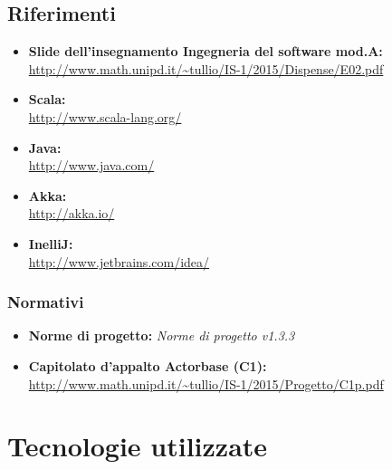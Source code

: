 \documentclass[a4paper]{article}
\begin{document}
	\subsection{Riferimenti}
		\begin{itemize}
			\item \textbf{Slide dell'insegnamento Ingegneria del software mod.A:} \\
			\url{http://www.math.unipd.it/~tullio/IS-1/2015/Dispense/E02.pdf}
			\item \textbf{Scala:} \\
			\url{http://www.scala-lang.org/}
			\item \textbf{Java:} \\
			\url{http://www.java.com/}
			\item \textbf{Akka:} \\
			\url{http://akka.io/}
			\item \textbf{InelliJ:} \\
			\url{http://www.jetbrains.com/idea/}
		\end{itemize}
	\subsubsection{Normativi}
		\begin{itemize}
			\item \textbf{Norme di progetto:} \emph{Norme di progetto v1.3.3}
			\item \textbf{Capitolato d'appalto Actorbase (C1):} \\ 
			\url{http://www.math.unipd.it/~tullio/IS-1/2015/Progetto/C1p.pdf}
		\end{itemize}
		
		
	\newpage 
	\section{Tecnologie utilizzate}
\end{document}
